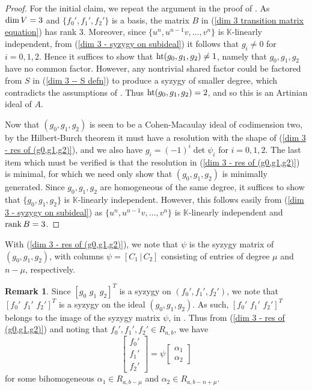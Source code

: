 \documentclass[reqno]{amsart}
\numberwithin{equation}{section}
\theoremstyle{definition}
\newtheorem{rem}[thm]{Remark}
\def\K{\mathbb{K}}
\def\dim{\mathop{\rm dim}}
\def\hgt{\mathop{\rm ht}}
\def\rk{\mathop{\rm rank}}
\begin{document}
\begin{proof}
For the initial claim, we repeat the argument in the proof of . As $\dim V =3$ and $\{f_0',f_1', f_2'\}$ is a basis, the matrix $B$ in (\ref{dim 3 transition matrix equation}) has rank $3$. Moreover, since $\{u^n,u^{n-1}v,\ldots,v^n\}$ is $\K$-linearly independent, from (\ref{dim 3 - syzygy on subideal}) it follows that $g_i\neq 0$ for $i=0,1,2$. Hence it suffices to show that $\hgt (g_0,g_1,g_2)\neq 1$, namely that $g_0,g_1,g_2$ have no common factor. However, any nontrivial shared factor could be factored from $S$ in (\ref{dim 3 -- S defn}) to produce a syzygy of smaller degree, which contradicts the assumptions of . Thus $\hgt (g_0,g_1,g_2) =2$, and so this is an Artinian ideal of $A$.

Now that $(g_0,g_1,g_2)$ is seen to be a Cohen-Macaulay ideal of codimension two, by the Hilbert-Burch theorem \cite[20.15]{Eisenbud} it must have a resolution with the shape of (\ref{dim 3 - res of (g0,g1,g2)}), and we also have $g_i = (-1)^i\det \psi_i$ for $i=0,1,2$. The last item which must be verified is that the resolution in (\ref{dim 3 - res of (g0,g1,g2)}) is minimal, for which we need only show that $(g_0,g_1,g_2)$ is minimally generated. Since $g_0,g_1,g_2$ are homogeneous of the same degree, it suffices to show that $\{g_0,g_1,g_2\}$ is $\K$-linearly independent. However, this follows easily from (\ref{dim 3 - syzygy on subideal}) as $\{u^n, u^{n-1}v, \ldots ,v^n\}$ is $\K$-linearly independent and $\rk B=3$.
\end{proof}

With (\ref{dim 3 - res of (g0,g1,g2)}), we note that $\psi$ is the syzygy matrix of $(g_0,g_1,g_2)$, with columns $\psi= [C_1\,|\, C_2]$ consisting of entries of degree $\mu$ and $n-\mu$, respectively.



\begin{rem}\label{dim 3 f' decomp}
Since $[g_0\, \,g_1\,\,g_2]^T$ is a syzygy on $(f_0',f_1',f_2')$, we note that $[f_0'\, \,f_1'\,\,f_2']^T$ is a syzygy on the ideal $(g_0,g_1,g_2)$. As such, $[f_0'\, \,f_1'\,\,f_2']^T$ belongs to the image of the syzygy matrix $\psi$, in . Thus from (\ref{dim 3 - res of (g0,g1,g2)}) and noting that $f_0',f_1',f_2' \in R_{a,b}$, we have
\begin{equation}\label{dim 3 - f alpha decomposition}
\left[\begin{array}{c}
     f_0'  \\[0.5ex]
     f_1'\\[0.5ex]
     f_2'
\end{array}\right] = \psi \left[\begin{array}{c}
    \alpha_1\\
    \alpha_2
\end{array}\right]
\end{equation}
for some bihomogeneous $\alpha_1 \in R_{a,b-\mu}$ and $\alpha_2\in R_{a,b-n+\mu}$.
\end{rem}
\end{document}
